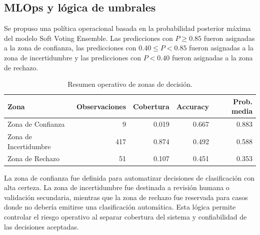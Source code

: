 \subsection{MLOps y l\'ogica de umbrales}
Se propuso una pol\'itica operacional basada en la probabilidad posterior m\'axima del modelo Soft Voting Ensemble. Las predicciones con $P \geq 0.85$ fueron asignadas a la zona de confianza, las predicciones con $0.40 \leq P < 0.85$ fueron asignadas a la zona de incertidumbre y las predicciones con $P < 0.40$ fueron asignadas a la zona de rechazo.

\begin{table}[H]
\centering
\caption{Resumen operativo de zonas de decisi\'on.}
\begin{tabular}{lrrrr}
\hline
Zona & Observaciones & Cobertura & Accuracy & Prob. media \\
\hline
Zona de Confianza & 9 & 0.019 & 0.667 & 0.883 \\
Zona de Incertidumbre & 417 & 0.874 & 0.492 & 0.588 \\
Zona de Rechazo & 51 & 0.107 & 0.451 & 0.353 \\
\hline
\end{tabular}
\end{table}

La zona de confianza fue definida para automatizar decisiones de clasificaci\'on con alta certeza. La zona de incertidumbre fue destinada a revisi\'on humana o validaci\'on secundaria, mientras que la zona de rechazo fue reservada para casos donde no deber\'ia emitirse una clasificaci\'on autom\'atica. Esta l\'ogica permite controlar el riesgo operativo al separar cobertura del sistema y confiabilidad de las decisiones aceptadas.
